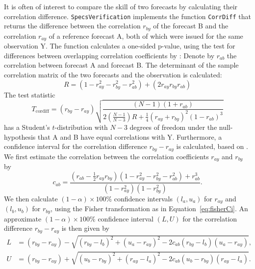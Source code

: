 \documentclass[10pt]{article}\usepackage[]{graphicx}\usepackage[]{color}
\newcommand{\pkg}[1]{\texttt{#1}}
\newcommand{\code}[1]{\texttt{#1}}
\begin{document}
It is often of interest to compare the skill of two forecasts by calculating their correlation difference.
\pkg{SpecsVerification} implements the function \code{CorrDiff} that returns the difference between the correlation $r_{by}$ of the forecast B and the correlation $r_{ay}$ of a reference forecast A, both of which were issued for the same observation Y.
The function calculates a one-sided p-value, using the test for differences between overlapping correlation coefficients by \citet{steiger1980tests}:
Denote by $r_{ab}$ the correlation between forecast A and forecast B.
The determinant of the sample correlation matrix of the two forecasts and the observation is calculated:
%
\begin{equation}
R  = (1 - r_{ay}^2 - r_{by}^2 - r_{ab}^2) + (2 r_{ay} r_{by} r_{ab})
\end{equation}
%
The test statistic
%
\begin{equation}
T_{\text{cordiff}}  = (r_{by} - r_{ay}) \sqrt{\frac{(N-1)(1+r_{ab})}{2\left(\frac{N-1}{N-3}\right) R+\frac{1}{4}(r_{ay}+r_{by})^2 (1-r_{ab})^3}}\label{eq:T2}
\end{equation}
%
has a Student's $t$-distribution with $N-3$ degrees of freedom under the null-hypothesis that A and B have equal correlations with Y.
Furthermore, a confidence interval for the correlation difference $r_{by}-r_{ay}$ is calculated, based on \citet{zou2007toward}.
We first estimate the correlation between the correlation coefficients $r_{ay}$ and $r_{by}$ by
%
\begin{equation}
c_{ab} = \frac{\left(r_{ab} - \frac{1}{2}  r_{ay}  r_{by}\right)  \left(1 - r_{ay}^2 - r_{by}^2 - r_{ab}^2\right) + r_{ab}^3}{(1-r_{ay}^2)(1-r_{by}^2)}.
\end{equation}
%
We then calculate $(1-\alpha)\times 100\%$ confidence intervals $(l_a, u_a)$ for $r_{ay}$ and $(l_b, u_b)$ for $r_{by}$, using the Fisher transformation as in Equation~\ref{eq:fisherCi}.
An approximate $(1-\alpha)\times 100\%$ confidence interval $(L,U)$ for the correlation difference $r_{by} - r_{ay}$ is then given by
%
\begin{align}
L & = (r_{by} - r_{ay}) - \sqrt{(r_{by} - l_b)^2 + (u_a-r_{ay})^2 - 2  c_{ab}  (r_{by} - l_b) 
(u_a - r_{ay})},\nonumber\\
U & =  (r_{by} - r_{ay}) + \sqrt{(u_{b} - r_{by})^2 + (r_{ay}-l_a)^2 - 2 c_{ab} (u_b-r_{by})(r_{ay}-l_a)}.\label{eq:zou}
\end{align}
\end{document}
